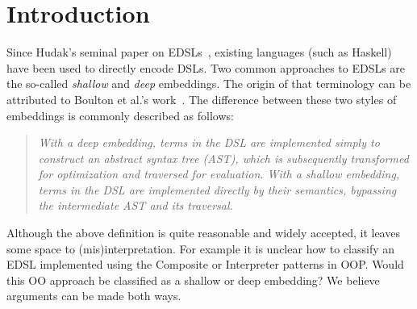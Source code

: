 \section{Introduction}

Since Hudak's seminal paper on EDSLs~\cite{hudak1998modular}, existing
languages (such as Haskell) have been used to directly encode
DSLs. Two common approaches to EDSLs are the so-called \emph{shallow}
and \emph{deep} embeddings. The origin of that terminology can be
attributed to Boulton et al.'s work~\cite{Boulton92dsl}. The difference between these
two styles of embeddings is commonly described as follows:

\begin{quote}
\emph{With a deep embedding, terms in the DSL are implemented simply to
construct an abstract syntax tree (AST), which is subsequently
transformed for optimization and traversed for evaluation. With a
shallow embedding, terms in the DSL are implemented directly by
their semantics, bypassing the intermediate AST and its traversal.}\cite{gibbons2014folding}
\end{quote}


\noindent Although the above definition is quite reasonable and widely accepted,
it leaves some space to (mis)interpretation. For example it is unclear 
how to classify an EDSL implemented using the {\sc Composite} or {\sc Interpreter} 
patterns in OOP. Would this OO approach be
classified as a shallow or deep embedding? We believe arguments can be
made both ways. 

